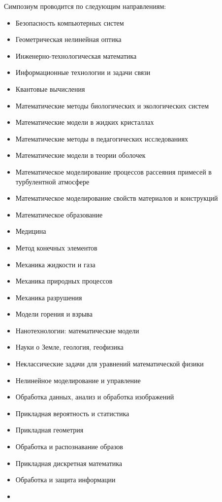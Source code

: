 \documentclass[10pt]{book}
\begin{document}
{\centering Симпозиум проводится по следующим направлениям:

\begin{multicols}{2}
\begin{itemize}
\item Безопасность компьютерных систем\item 
Геометрическая нелинейная оптика\item 
Инженерно-технологическая математика\item 
Информационные технологии и задачи связи\item 
Квантовые вычисления\item 
Математические методы биологических и экологических систем\item 
Математические модели в жидких кристаллах\item 
Математические методы в педагогических исследованиях\item 
Математические модели в теории оболочек\item 
Математическое моделирование процессов рассеяния примесей в турбулентной атмосфере\item 
Математическое моделирование свойств материалов и конструкций\item 
Математическое образование\item  
Медицина\item  
Метод конечных элементов\item 
Механика жидкости и газа\item  
Механика природных процессов\item  
Механика разрушения\item 
Модели горения и взрыва\item  
Нанотехнологии: математические модели\item 
Науки о Земле, геология, геофизика\item 
 Неклассические задачи для уравнений математической физики
  \item Нелинейное моделирование и управление\item 
  Обработка данных, анализ и обработка изображений\item 
  Прикладная вероятность и статистика\item 
  Прикладная геометрия\item 
  Обработка и распознавание образов\item 
  Прикладная дискретная математика\item 
  Обработка и защита информации\item 

\end{itemize}
\end{multicols}}
\end{document}
